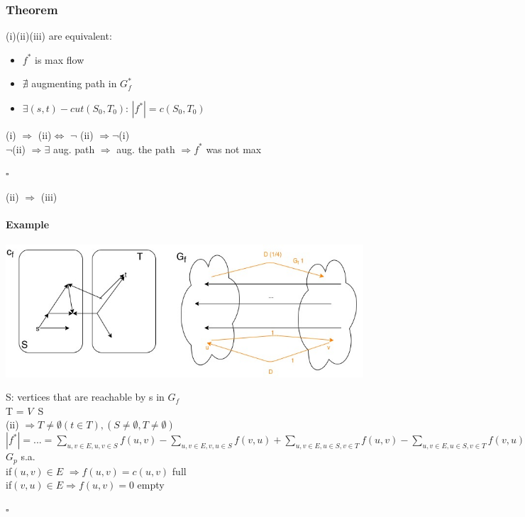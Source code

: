 \subsubsection{Theorem}
(i)(ii)(iii) are equivalent: \\
\begin{itemize}
	\item[(i)] $f^*$ is max flow
	
	\item[(ii)] $\nexists$ augmenting path in $G^*_f$
	
	\item[(iii)] $\exists (s,t)-cut (S_0,T_0)$: $|f^*| = c(S_0,T_0)$
	
\end{itemize}
(i) $\Rightarrow$ (ii)$\Leftrightarrow$ $\neg$ (ii) $\Rightarrow \neg$(i) \\
$\neg$(ii) $\Rightarrow \exists$ aug. path $\Rightarrow$ aug. the path $\Rightarrow f^*$ was not max
\begin{flushright}
$\square$
\end{flushright}
(ii) $\Rightarrow$ (iii) \\

\paragraph{Example}
\begin{center}
	\includegraphics[scale=0.5]{img/graph13}
\end{center}
S: vertices that are reachable by s in $G_f$ \\
T = $V$\ S \\
(ii) $\Rightarrow T \neq  \emptyset (t\in T), (S \neq \emptyset, T \neq \emptyset)$ \\
$|f^*| = ... = \sum_{u,v\in E, u,v\in S}f(u,v)-\sum_{u,v\in E, v,u\in S}f(v,u) + \sum_{u,v\in E, u\in S,v\in T}f(u,v)-\sum_{u,v\in E, u\in S,v\in T}f(v,u)$ \\
$G_p$ s.a. \\
if$(u,v)\in E$ $\Rightarrow f(u,v) = c(u,v)$  full \\
if$(v,u)\in E \Rightarrow f(u,v) = 0$ empty
\begin{flushright}
	$\square$
\end{flushright}

